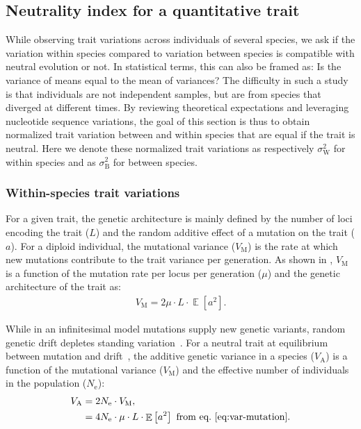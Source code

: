 \documentclass{article}
\newcommand{\Multiply}{\cdot}
\DeclareMathOperator{\E}{\mathbb{E}}
\newcommand{\Ne}{N_{\text{e}}}
\newcommand{\MutationRatePheno}{\mu}
\newcommand{\NbrLoci}{L}
\newcommand{\VarGenetic}{V_{\mathrm{A}}}
\newcommand{\VarMutation}{V_{\mathrm{M}}}
\newcommand{\GenArchi}{\NbrLoci \Multiply \E \left[ a^2 \right]}
\newcommand{\RateBetween}{\sigma^2_{\mathrm{B}}}
\newcommand{\RateWhithin}{\sigma^2_{\mathrm{W}}}
\begin{document}
\subsection*{Neutrality index for a quantitative trait}\label{subsec:neutrality-index-for-a-quantitative-trait}

While observing trait variations across individuals of several species, we ask if the variation within species compared to variation between species is compatible with neutral evolution or not.
In statistical terms, this can also be framed as: Is the variance of means equal to the mean of variances?
The difficulty in such a study is that individuals are not independent samples, but are from species that diverged at different times.
By reviewing theoretical expectations and leveraging nucleotide sequence variations, the goal of this section is thus to obtain normalized trait variation between and within species that are equal if the trait is neutral.
Here we denote these normalized trait variations as respectively $\RateWhithin$ for within species and as $\RateBetween$ for between species.

\subsubsection*{Within-species trait variations}

For a given trait, the genetic architecture is mainly defined by the number of loci encoding the trait ($\NbrLoci$) and the random additive effect of a mutation on the trait ($a$).
For a diploid individual, the mutational variance ($\VarMutation$) is the rate at which new mutations contribute to the trait variance per generation.
As shown in \citet{lande_quantitative_1979, lande_sexual_1980}, $\VarMutation$ is a function of the mutation rate per locus per generation ($\MutationRatePheno$) and the genetic architecture of the trait as:
\begin{gather}
    \VarMutation = 2 \MutationRatePheno \Multiply \GenArchi \label{eq:var-mutation}.
\end{gather}

While in an infinitesimal model mutations supply new genetic variants, random genetic drift depletes standing variation~\citep{turelli_commentary_2017, barton_infinitesimal_2017, sella_thinking_2019}.
For a neutral trait at equilibrium between mutation and drift~\citep{lynch_mutation_1998}, the additive genetic variance in a species ($\VarGenetic$) is a function of the mutational variance ($\VarMutation$) and the effective number of individuals in the population ($\Ne$):
\begin{align}
    \VarGenetic & =  2 \Ne \Multiply \VarMutation, \\
    & = 4 \Ne \Multiply \MutationRatePheno \Multiply \GenArchi \text{ from eq.~\ref{eq:var-mutation}}\label{eq:var-genetic}.
\end{align}
\end{document}
